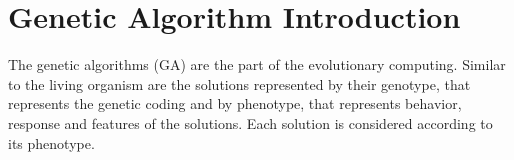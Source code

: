 \section{Genetic Algorithm Introduction}
The genetic algorithms (GA) are the part of the evolutionary computing. Similar to the living organism are the solutions represented by their genotype, that represents the genetic coding and by phenotype, that represents behavior, response and features of the solutions. Each solution is considered according to its phenotype.